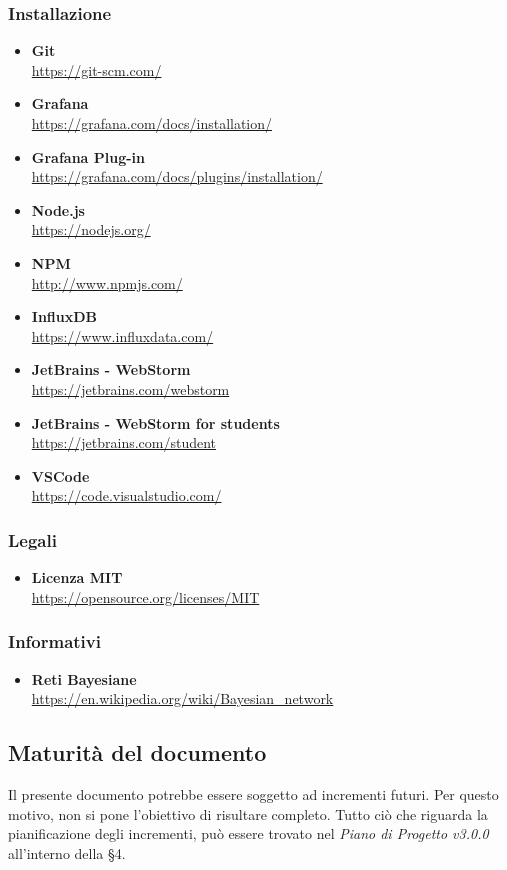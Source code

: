 \subsubsection{Installazione}
\begin{itemize}
	\item{\textbf{Git}\\
		\url{https://git-scm.com/}}
	\item{\textbf{Grafana}\\
		\url{https://grafana.com/docs/installation/}}
	\item{\textbf{Grafana Plug-in}\\
		\url{https://grafana.com/docs/plugins/installation/}}
	\item{\textbf{Node.js}\\
		\url{https://nodejs.org/}}
	\item{\textbf{NPM}\\
		\url{http://www.npmjs.com/}}
	\item{\textbf{InfluxDB}\\
		\url{https://www.influxdata.com/}}
	\item{\textbf{JetBrains - WebStorm}\\
		\url{https://jetbrains.com/webstorm}}
	\item{\textbf{JetBrains - WebStorm for students}\\
		\url{https://jetbrains.com/student}}
	\item{\textbf{VSCode}\\
		\url{https://code.visualstudio.com/}}
\end{itemize}
\subsubsection{Legali}
\begin{itemize}
	\item{\textbf{Licenza MIT}\\
		\url{https://opensource.org/licenses/MIT}}
\end{itemize}
\subsubsection{Informativi}
\begin{itemize}
	\item{\textbf{Reti Bayesiane}\\
			\url{https://en.wikipedia.org/wiki/Bayesian_network}}
\end{itemize}

\subsection{Maturità del documento}
Il presente documento potrebbe essere soggetto ad incrementi futuri. Per questo motivo, non si pone l'obiettivo di risultare completo.
Tutto ciò che riguarda la pianificazione degli incrementi, può essere trovato nel \emph{Piano di Progetto v3.0.0} all'interno della §4.
\pagebreak
